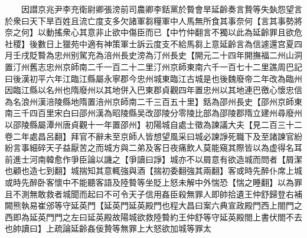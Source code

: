 　　因譛京兆尹李充衛尉卿張滂前司農卿李銛黨於䞇會旱延齡奏言贄等失埶怨望言於衆曰天下旱百姓且流亡度支多欠諸軍芻糧軍中人馬無所食其事奈何【言其事勢將奈之何】以動搖衆心其意非止欲中傷臣而已【中竹仲翻言不獨以此為延齡罪且欲危社稷】後數日上獵苑中適有神策軍士訴云度支不給馬芻上意延齡言為信遽還宫夏四月壬戌貶䞇為忠州别駕充為涪州長史滂為汀州長史【開元二十四年開撫福二州山洞置汀州舊志忠州京師南二千一百二十二里汀州京師東南六千一百七十二里譙周巴記曰後漢初平六年江臨江縣屬永寧郡今忠州城東臨江古城是也後魏廢帝二年改為臨州因臨江縣以名州也隋廢州以其地併入巴東郡貞觀四年置忠州以其地連巴徼心懷忠信為名浪州漢涪陵縣地隋置涪州京師南二千三百五十里】銛為邵州長史【邵州京師東南三千四百里宋白曰邵州漢為昭陵縣吴改邵陵分零陵比部為邵陵郡隋立建州尋廢州以邵陵縣屬潭州唐貞觀十一年置邵州】初陽城自處士徵為諫議大夫【見二百三十二卷二年處昌呂翻】拜官不辭未至京師人皆想望風采曰城必諫諍死職下及至諸諫官紛紛言事細碎天子益厭苦之而城方與二弟及客日夜痛飲人莫能窺其際皆以為虚得名耳前進士河南韓愈作爭臣論以譏之【爭讀曰諍】城亦不以屑意有欲造城而問者【屑潔也顧也造七到翻】城揣知其意輒強與酒【揣初委翻強其兩翻】客或時先醉仆席上城或時先醉卧客懷中不能聽客語及陸䞇等坐貶上怒未解中外惴恐【惴之睡翻】以為罪且不測無敢救者城聞而起曰不可令天子信用姦臣殺無罪人即帥拾遺王仲舒歸登右補闕熊執易崔邠等守延英門【延英門延英殿門也程大昌曰案六典宣政殿門西上閤門之西即為延英門門之左曰延英殿故陽城欲救陸䞇約王仲舒等守延英殿閤上書伏閤不去也帥讀曰】上疏論延齡姦佞贄等無罪上大怒欲加城等罪太

